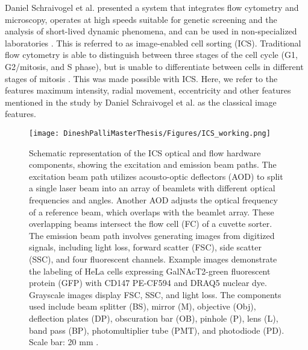 \documentclass[12pt,a4paper]{article}
\begin{document}
Daniel Schraivogel et al. presented a system that integrates flow cytometry and microscopy, operates at high speeds suitable for genetic screening and the analysis of short-lived dynamic phenomena, and can be used in non-specialized laboratories \cite{doi:10.1126/science.abj3013}. This is referred to as image-enabled cell sorting (ICS). Traditional flow cytometry is able to distinguish between three stages of the cell cycle (G1, G2/mitosis, and S phase), but is unable to differentiate between cells in different stages of mitosis \cite{doi:10.1126/science.abj3013}. This was made possible with ICS. Here, we refer to the features maximum intensity, radial movement, eccentricity and other features mentioned in the study by Daniel Schraivogel et al. as the classical image features.


\begin{figure}
  \centering
  \texttt{[image: DineshPalliMasterThesis/Figures/ICS\_working.png]}
  \caption{Schematic representation of the ICS optical and flow hardware components, showing the excitation and emission beam paths. The excitation beam path utilizes acousto-optic deflectors (AOD) to split a single laser beam into an array of beamlets with different optical frequencies and angles. Another AOD adjusts the optical frequency of a reference beam, which overlaps with the beamlet array. These overlapping beams intersect the flow cell (FC) of a cuvette sorter. The emission beam path involves generating images from digitized signals, including light loss, forward scatter (FSC), side scatter (SSC), and four fluorescent channels. Example images demonstrate the labeling of HeLa cells expressing GalNAcT2-green fluorescent protein (GFP) with CD147 PE-CF594 and DRAQ5 nuclear dye. Grayscale images display FSC, SSC, and light loss. The components used include beam splitter (BS), mirror (M), objective (Obj), deflection plates (DP), obscuration bar (OB), pinhole (P), lens (L), band pass (BP), photomultiplier tube (PMT), and photodiode (PD). Scale bar: 20 mm \cite{doi:10.1126/science.abj3013}.}
  \label{icsworking}
\end{figure}
\end{document}
